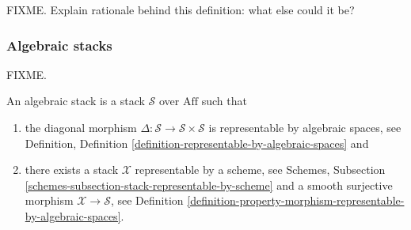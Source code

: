 \noindent
FIXME. Explain rationale behind this definition: what else could it be?


\subsubsection{Algebraic stacks}
\label{subsubsection-algebraic-stacks}

\noindent
FIXME.

\begin{definition}
An algebraic stack is a stack $\mathcal{S}$ over $\text{Aff}$ such that
\begin{enumerate}
\item the diagonal morphism
$\Delta : \mathcal{S} \to \mathcal{S}\times\mathcal{S}$
is representable by algebraic spaces, see Definition,
Definition \ref{definition-representable-by-algebraic-spaces} and
\item there exists a stack $\mathcal{X}$ representable by a scheme, see
Schemes, Subsection \ref{schemes-subsection-stack-representable-by-scheme}
and a smooth surjective morphism $\mathcal{X} \to \mathcal{S}$,
see Definition
\ref{definition-property-morphism-representable-by-algebraic-spaces}.
\end{enumerate}
\end{definition}







